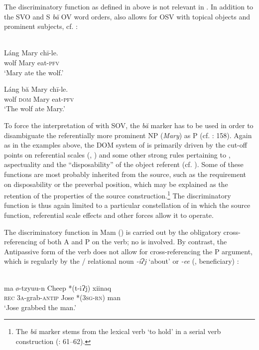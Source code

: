 \documentclass[output=paper]{langsci/langscibook}
\begin{document}
The discriminatory function as defined in  above is not relevant in . In addition to the  SVO and S \textit{bă} OV word orders,  also allows for OSV with topical objects and prominent subjects, cf. :

\ea\label{ex:serzant:21}
\\
\ea
\gll Láng   Mary   chī-le.\\
     wolf  Mary  eat-\textsc{pfv}\\
\glt ‘Mary ate the wolf.’

\ex
\gll Láng bă   Mary   chī-le.\\
     wolf \textsc{dom}   Mary  eat-\textsc{pfv}\\
\glt ‘The wolf ate Mary.’
\z
\z

To force the interpretation of  with SOV, the \textit{bă} marker has to be used in order to disambiguate the referentially more prominent NP (\textit{Mary}) as P (cf. \citealt{Bisang1992}: 158). Again as in the examples above, the DOM system of  is primarily driven by the cut-off points on referential scales (, ) and some other strong rules pertaining to , aspectuality and the “disposability” of the object referent (cf. \citealt{LiThompson1981}). Some of these functions are most probably inherited from the source, such as the requirement on disposability or the preverbal position, which may be explained as the retention of the properties of the source construction.\footnote{The \textit{bă} marker stems from the lexical verb ‘to hold’ in a serial verb construction (\citealt{Sun1996}: 61–62).}  The discriminatory function is thus again limited to a particular constellation of  in which the source function, referential scale effects and other forces allow it to operate.

The discriminatory function in Mam () is carried out by the obligatory cross-referencing of both A and P on the verb; no  is involved. By contrast, the Antipassive form of the verb does not allow for cross-referencing the P argument, which is regularly  by the  / relational noun \textit{{}-iɁj} ‘about’ or \textit{{}-ee} (, beneficiary) \citep[212]{England1983}:

\ea 
{}\\
\gll ma   ø-tzyuu-n   Cheep   *(t-iɁj)   xiinaq\\
     \textsc{rec}   3\textsc{a}{}-grab-\textsc{antip}   Jose   *(3\textsc{sg}{}-\textsc{rn})   man\\
\glt ‘Jose grabbed the man.’
\z
\end{document}
